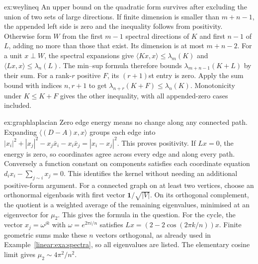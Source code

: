 \begin{solution}{ex:weylineq}
\idea An upper bound on the quadratic form survives after excluding the union of two sets of large directions.
\writeup If finite dimension is smaller than $m+n-1$, the appended left side is zero and the inequality follows from positivity. Otherwise form $W$ from the first $m-1$ spectral directions of $K$ and first $n-1$ of $L$, adding no more than those that exist. Its dimension is at most $m+n-2$. For a unit $x\perp W$, the spectral expansions give $\langle Kx,x\rangle\le\lambda_m(K)$ and $\langle Lx,x\rangle\le\lambda_n(L)$. The min--sup formula therefore bounds $\lambda_{m+n-1}(K+L)$ by their sum.
For a rank-$r$ positive $F$, its $(r+1)$st entry is zero. Apply the sum bound with indices $n,r+1$ to get $\lambda_{n+r}(K+F)\le\lambda_n(K)$. Monotonicity under $K\le K+F$ gives the other inequality, with all appended-zero cases included.
\end{solution}

\begin{solution}{ex:graphlaplacian}
\idea Zero edge energy means no change along any connected path.
\writeup Expanding $\langle(D-A)x,x\rangle$ groups each edge into
$|x_i|^2+|x_j|^2-x_j\bar x_i-x_i\bar x_j=|x_i-x_j|^2$.
This proves positivity. If $Lx=0$, the energy is zero, so coordinates agree across every edge and along every path. Conversely a function constant on components satisfies each coordinate equation $d_ix_i-\sum_{j\sim i}x_j=0$. This identifies the kernel without needing an additional positive-form argument.
For a connected graph on at least two vertices, choose an orthonormal eigenbasis with first vector $\mathbf1/\sqrt{|V|}$. On its orthogonal complement, the quotient is a weighted average of the remaining eigenvalues, minimised at an eigenvector for $\mu_2$. This gives the formula in the question.
For the cycle, the vector $x_j=\omega^{jk}$ with $\omega=e^{2\pi i/n}$ satisfies $Lx=(2-2\cos(2\pi k/n))x$. Finite geometric sums make these $n$ vectors orthogonal, as already used in Example~\ref{linear:exa:spectra}, so all eigenvalues are listed. The elementary cosine limit gives $\mu_2\sim4\pi^2/n^2$.
\end{solution}

